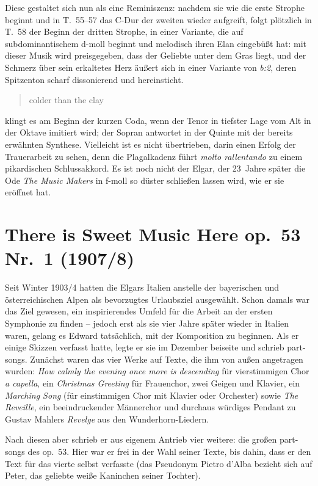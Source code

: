 \documentclass[a4paper,11pt,open=any]{scrbook}
\newcommand{\engquote}[1]{\foreignblockquote{english}{#1}}
\begin{document}
Diese gestaltet sich nun als eine Reminiszenz: nachdem sie wie die erste
Strophe beginnt und in T.~55–57 das C-Dur der zweiten wieder aufgreift, folgt
plötzlich in T.~58 der Beginn der dritten Strophe, in einer Variante, die
auf subdominantischem d-moll beginnt und melodisch ihren Elan eingebüßt hat:
mit dieser Musik wird preisgegeben, dass der Geliebte unter dem Gras liegt,
und der Schmerz über sein erkaltetes Herz äußert sich in einer Variante von
\textit{b:2}, deren Spitzenton scharf dissonierend und  hereinsticht.  \engquote{colder than the clay} klingt es am Beginn
der kurzen Coda, wenn der Tenor in tiefster Lage vom Alt in der Oktave
imitiert wird; der Sopran antwortet in der Quinte mit der bereits erwähnten
Synthese.  Vielleicht ist es nicht übertrieben, darin einen Erfolg der
Trauerarbeit zu sehen, denn die Plagalkadenz führt \textit{molto rallentando}
zu einem pikardischen Schlussakkord.  Es ist noch nicht der Elgar, der
23~Jahre später die Ode \textit{The Music Makers} in f-moll so düster
schließen lassen wird, wie er sie eröffnet hat.

\section{There is Sweet Music Here \textmd{op.~53 Nr.~1 (1907/8)}}

Seit Winter 1903/4 hatten die Elgars Italien anstelle der bayerischen
und österreichischen Alpen als bevorzugtes Urlaubsziel ausgewählt.  Schon
damals war das Ziel gewesen, ein inspirierendes Umfeld für die Arbeit an
der ersten Symphonie zu finden – jedoch erst als sie vier Jahre später
wieder in Italien waren, gelang es Edward tatsächlich, mit der Komposition
zu beginnen.  Als er einige Skizzen verfasst hatte, legte er sie im Dezember
beiseite und schrieb part-songs.  Zunächst waren das vier Werke auf Texte,
die ihm von außen angetragen wurden: \textit{How calmly the evening once
more is descending} für vierstimmigen Chor \textit{a capella}, ein
\textit{Christmas Greeting} für Frauenchor, zwei Geigen und Klavier,
ein \textit{Marching Song} (für einstimmigen Chor mit Klavier oder
Orchester) sowie \textit{The Reveille}, ein beeindruckender Männerchor
und durchaus würdiges Pendant zu Gustav Mahlers \textit{Revelge} aus
den Wunderhorn-Liedern.

Nach diesen aber schrieb er aus eigenem Antrieb vier weitere: die großen
part-songs des op.~53.  Hier war er frei in der Wahl seiner Texte, bis
dahin, dass er den Text für das vierte selbst verfasste (das Pseudonym
Pietro d’Alba bezieht sich auf Peter, das geliebte weiße Kaninchen
seiner Tochter).
\end{document}
